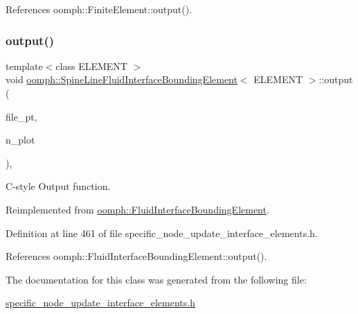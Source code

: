 References oomph\+::\+Finite\+Element\+::output().

\mbox{\label{classoomph_1_1SpineLineFluidInterfaceBoundingElement_ab1dbf8b8c22f78d08d431e06db80793a}} 
\subsubsection{\texorpdfstring{output()}{output()}\hspace{0.1cm}{\footnotesize\ttfamily [4/4]}}
{\footnotesize\ttfamily template$<$class E\+L\+E\+M\+E\+NT $>$ \\
void \hyperlink{classoomph_1_1SpineLineFluidInterfaceBoundingElement}{oomph\+::\+Spine\+Line\+Fluid\+Interface\+Bounding\+Element}$<$ E\+L\+E\+M\+E\+NT $>$\+::output (\begin{DoxyParamCaption}\item[{F\+I\+LE $\ast$}]{file\+\_\+pt,  }\item[{const unsigned \&}]{n\+\_\+plot }\end{DoxyParamCaption})\hspace{0.3cm}{\ttfamily [inline]}, {\ttfamily [virtual]}}



C-\/style Output function. 



Reimplemented from \hyperlink{classoomph_1_1FluidInterfaceBoundingElement_ae85ea987a06275a03ad6d0e3710871da}{oomph\+::\+Fluid\+Interface\+Bounding\+Element}.



Definition at line 461 of file specific\+\_\+node\+\_\+update\+\_\+interface\+\_\+elements.\+h.



References oomph\+::\+Fluid\+Interface\+Bounding\+Element\+::output().



The documentation for this class was generated from the following file\+:\begin{DoxyCompactItemize}
\item 
\hyperlink{specific__node__update__interface__elements_8h}{specific\+\_\+node\+\_\+update\+\_\+interface\+\_\+elements.\+h}\end{DoxyCompactItemize}
